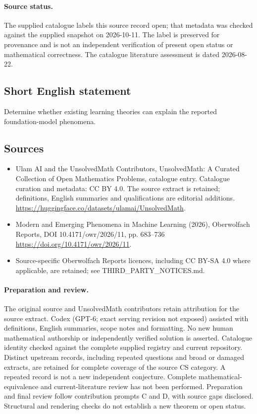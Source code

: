 \documentclass[11pt]{article}
\begin{document}
\paragraph{Source status.}
The supplied catalogue labels this source record open; that metadata was checked against the supplied snapshot on 2026-10-11. The label is preserved for provenance and is not an independent verification of present open status or mathematical correctness. The catalogue literature assessment is dated 2026-08-22.
\subsection{Short English statement}
Determine whether existing learning theories can explain the reported foundation-model phenomena.
\subsection{Sources}
\begin{itemize}
\item[S1] Ulam AI and the UnsolvedMath Contributors, UnsolvedMath: A Curated Collection of Open Mathematics Problems, catalogue entry. Catalogue curation and metadata: CC BY 4.0. The source extract is retained; definitions, English summaries and qualifications are editorial additions.
\url{https://huggingface.co/datasets/ulamai/UnsolvedMath}.
\item[S2] Modern and Emerging Phenomena in Machine Learning (2026), Oberwolfach Reports, DOI 10.4171/owr/2026/11, pp. 683--736
\url{https://doi.org/10.4171/owr/2026/11}.
\item Source-specific Oberwolfach Reports licences, including CC BY-SA 4.0 where applicable, are retained; see THIRD\_PARTY\_NOTICES.md.
\end{itemize}
\paragraph{Preparation and review.}
The original source and UnsolvedMath contributors retain attribution for the source extract. Codex (GPT-6; exact serving revision not exposed) assisted with definitions, English summaries, scope notes and formatting. No new human mathematical authorship or independently verified solution is asserted. Catalogue identity checked against the complete supplied registry and current repository. Distinct upstream records, including repeated questions and broad or damaged extracts, are retained for complete coverage of the source CS category. A repeated record is not a new independent conjecture. Complete mathematical-equivalence and current-literature review has not been performed. Preparation and final review follow contribution prompts C and D, with source gaps disclosed. Structural and rendering checks do not establish a new theorem or open status.
\label{end:statement}
\end{document}
